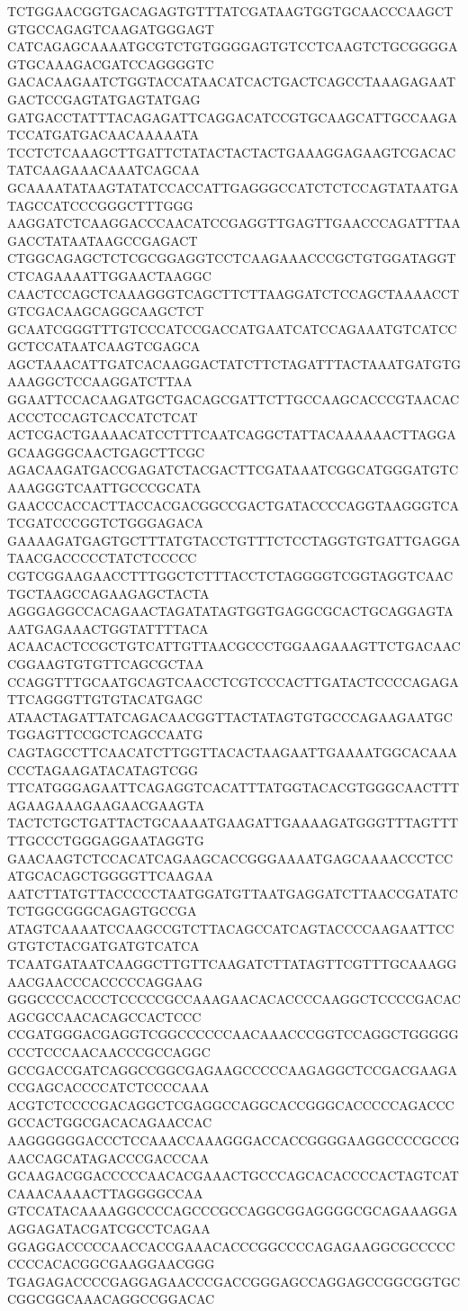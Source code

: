 TCTGGAACGGTGACAGAGTGTTTATCGATAAGTGGTGCAACCCAAGCTGTGCCAGAGTCAAGATGGGAGT
CATCAGAGCAAAATGCGTCTGTGGGGAGTGTCCTCAAGTCTGCGGGGAGTGCAAAGACGATCCAGGGGTC
GACACAAGAATCTGGTACCATAACATCACTGACTCAGCCTAAAGAGAATGACTCCGAGTATGAGTATGAG
GATGACCTATTTACAGAGATTCAGGACATCCGTGCAAGCATTGCCAAGATCCATGATGACAACAAAAATA
TCCTCTCAAAGCTTGATTCTATACTACTACTGAAAGGAGAAGTCGACACTATCAAGAAACAAATCAGCAA
GCAAAATATAAGTATATCCACCATTGAGGGCCATCTCTCCAGTATAATGATAGCCATCCCGGGCTTTGGG
AAGGATCTCAAGGACCCAACATCCGAGGTTGAGTTGAACCCAGATTTAAGACCTATAATAAGCCGAGACT
CTGGCAGAGCTCTCGCGGAGGTCCTCAAGAAACCCGCTGTGGATAGGTCTCAGAAAATTGGAACTAAGGC
CAACTCCAGCTCAAAGGGTCAGCTTCTTAAGGATCTCCAGCTAAAACCTGTCGACAAGCAGGCAAGCTCT
GCAATCGGGTTTGTCCCATCCGACCATGAATCATCCAGAAATGTCATCCGCTCCATAATCAAGTCGAGCA
AGCTAAACATTGATCACAAGGACTATCTTCTAGATTTACTAAATGATGTGAAAGGCTCCAAGGATCTTAA
GGAATTCCACAAGATGCTGACAGCGATTCTTGCCAAGCACCCGTAACACACCCTCCAGTCACCATCTCAT
ACTCGACTGAAAACATCCTTTCAATCAGGCTATTACAAAAAACTTAGGAGCAAGGGCAACTGAGCTTCGC
AGACAAGATGACCGAGATCTACGACTTCGATAAATCGGCATGGGATGTCAAAGGGTCAATTGCCCGCATA
GAACCCACCACTTACCACGACGGCCGACTGATACCCCAGGTAAGGGTCATCGATCCCGGTCTGGGAGACA
GAAAAGATGAGTGCTTTATGTACCTGTTTCTCCTAGGTGTGATTGAGGATAACGACCCCCTATCTCCCCC
CGTCGGAAGAACCTTTGGCTCTTTACCTCTAGGGGTCGGTAGGTCAACTGCTAAGCCAGAAGAGCTACTA
AGGGAGGCCACAGAACTAGATATAGTGGTGAGGCGCACTGCAGGAGTAAATGAGAAACTGGTATTTTACA
ACAACACTCCGCTGTCATTGTTAACGCCCTGGAAGAAAGTTCTGACAACCGGAAGTGTGTTCAGCGCTAA
CCAGGTTTGCAATGCAGTCAACCTCGTCCCACTTGATACTCCCCAGAGATTCAGGGTTGTGTACATGAGC
ATAACTAGATTATCAGACAACGGTTACTATAGTGTGCCCAGAAGAATGCTGGAGTTCCGCTCAGCCAATG
CAGTAGCCTTCAACATCTTGGTTACACTAAGAATTGAAAATGGCACAAACCCTAGAAGATACATAGTCGG
TTCATGGGAGAATTCAGAGGTCACATTTATGGTACACGTGGGCAACTTTAGAAGAAAGAAGAACGAAGTA
TACTCTGCTGATTACTGCAAAATGAAGATTGAAAAGATGGGTTTAGTTTTTGCCCTGGGAGGAATAGGTG
GAACAAGTCTCCACATCAGAAGCACCGGGAAAATGAGCAAAACCCTCCATGCACAGCTGGGGTTCAAGAA
AATCTTATGTTACCCCCTAATGGATGTTAATGAGGATCTTAACCGATATCTCTGGCGGGCAGAGTGCCGA
ATAGTCAAAATCCAAGCCGTCTTACAGCCATCAGTACCCCAAGAATTCCGTGTCTACGATGATGTCATCA
TCAATGATAATCAAGGCTTGTTCAAGATCTTATAGTTCGTTTGCAAAGGAACGAACCCACCCCCAGGAAG
GGGCCCCACCCTCCCCCGCCAAAGAACACACCCCAAGGCTCCCCGACACAGCGCCAACACAGCCACTCCC
CCGATGGGACGAGGTCGGCCCCCCAACAAACCCGGTCCAGGCTGGGGGCCCTCCCAACAACCCGCCAGGC
GCCGACCGATCAGGCCGGCGAGAAGCCCCCAAGAGGCTCCGACGAAGACCGAGCACCCCATCTCCCCAAA
ACGTCTCCCCGACAGGCTCGAGGCCAGGCACCGGGCACCCCCAGACCCGCCACTGGCGACACAGAACCAC
AAGGGGGGACCCTCCAAACCAAAGGGACCACCGGGGAAGGCCCCGCCGAACCAGCATAGACCCGACCCAA
GCAAGACGGACCCCCAACACGAAACTGCCCAGCACACCCCACTAGTCATCAAACAAAACTTAGGGGCCAA
GTCCATACAAAAGGCCCCAGCCCGCCAGGCGGAGGGGCGCAGAAAGGAAGGAGATACGATCGCCTCAGAA
GGAGGACCCCCAACCACCGAAACACCCGGCCCCAGAGAAGGCGCCCCCCCCCACACGGCGAAGGAACGGG
TGAGAGACCCCGAGGAGAACCCGACCGGGAGCCAGGAGCCGGCGGTGCCGGCGGCAAACAGGCCGGACAC
